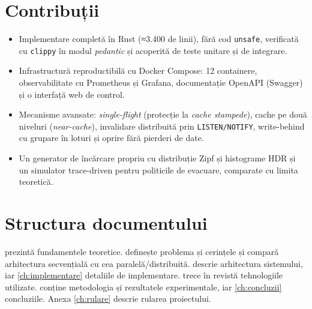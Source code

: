 \section{Contribuții}

\begin{itemize}
  \item Implementare completă în Rust (≈3.400 de linii), fără cod \texttt{unsafe}, verificată cu
        \texttt{clippy} în modul \emph{pedantic} și acoperită de teste unitare și de integrare.
  \item Infrastructură reproductibilă cu Docker Compose: 12 containere, observabilitate cu
        Prometheus și Grafana, documentație OpenAPI (Swagger) și o interfață web de control.
  \item Mecanisme avansate: \emph{single-flight} (protecție la \emph{cache stampede}), cache pe două
        niveluri (\emph{near-cache}), invalidare distribuită prin \texttt{LISTEN/NOTIFY}, write-behind cu
        grupare în loturi și oprire fără pierderi de date.
  \item Un generator de încărcare propriu cu distribuție Zipf și histograme HDR și un simulator
        trace-driven pentru politicile de evacuare, comparate cu limita teoretică.
\end{itemize}

\section{Structura documentului}

 prezintă fundamentele teoretice.  definește problema și
cerințele și compară arhitectura secvențială cu cea paralelă/distribuită. 
descrie arhitectura sistemului, iar \cref{ch:implementare} detaliile de implementare.
 trece în revistă tehnologiile utilizate.  conține
metodologia și rezultatele experimentale, iar \cref{ch:concluzii} concluziile. Anexa
\ref{ch:rulare} descrie rularea proiectului.
